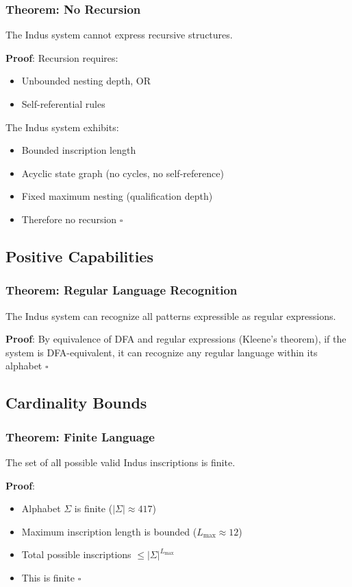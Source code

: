 \subsubsection{Theorem: No Recursion}
The Indus system cannot express recursive structures.

\textbf{Proof}: Recursion requires:
\begin{itemize}
    \item Unbounded nesting depth, OR
    \item Self-referential rules
\end{itemize}

The Indus system exhibits:
\begin{itemize}
    \item Bounded inscription length
    \item Acyclic state graph (no cycles, no self-reference)
    \item Fixed maximum nesting (qualification depth)
    \item Therefore no recursion $\square$
\end{itemize}

\subsection{Positive Capabilities}

\subsubsection{Theorem: Regular Language Recognition}
The Indus system can recognize all patterns expressible as regular expressions.

\textbf{Proof}: By equivalence of DFA and regular expressions (Kleene's theorem), if the system is DFA-equivalent, it can recognize any regular language within its alphabet $\square$

\subsection{Cardinality Bounds}

\subsubsection{Theorem: Finite Language}
The set of all possible valid Indus inscriptions is finite.

\textbf{Proof}:
\begin{itemize}
    \item Alphabet $\Sigma$ is finite ($|\Sigma| \approx 417$)
    \item Maximum inscription length is bounded ($L_{\max} \approx 12$)
    \item Total possible inscriptions $\leq |\Sigma|^{L_{\max}}$
    \item This is finite $\square$
\end{itemize}

